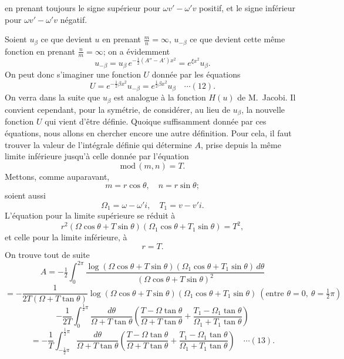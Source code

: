 \documentclass[12pt,a4paper]{article}
\begin{document}
\newpage
\setcounter{page}{162}

en prenant toujours le signe sup\'erieur pour $\omega v' - \omega' v$ positif, et le signe inf\'erieur pour $\omega v' - \omega' v$ n\'egatif.

Soient $u_\beta$ ce que devient $u$ en prenant $\tfrac{m}{n} = \infty$, $u_{-\beta}$ ce que devient cette m\^eme fonction en prenant $\tfrac{n}{m} = \infty$; on a \'evidemment
\[
u_{-\beta} = u_\beta\,e^{-\frac{1}{2}(A''-A')x^2} = e^{\xi x^2}u_\beta.
\]
On peut donc s'imaginer une fonction $U$ donn\'ee par les \'equations
\[
U = e^{-\frac12\beta x^2} u_{-\beta} = e^{\frac12\beta x^2} u_\beta \quad\cdots(12).
\]
On verra dans la suite que $u_\beta$ est analogue \`a la fonction $H(u)$ de M.~Jacobi. Il convient cependant, pour la sym\'etrie, de consid\'erer, au lieu de $u_\beta$, la nouvelle fonction $U$ qui vient d'\^etre d\'efinie. Quoique suffisamment donn\'ee par ces \'equations, nous allons en chercher encore une autre d\'efinition. Pour cela, il faut trouver la valeur de l'int\'egrale d\'efinie qui d\'etermine $A$, prise depuis la m\^eme limite inf\'erieure jusqu'\`a celle donn\'ee par l'\'equation
\[
\mathrm{mod}\,(m,n) = T.
\]
Mettons, comme auparavant,
\[
m = r\cos\theta,\quad n = r\sin\theta;
\]
soient aussi
\[
\Omega_1 = \omega - \omega' i,\quad T_1 = v - v' i.
\]
L'\'equation pour la limite sup\'erieure se r\'eduit \`a
\[
r^2(\Omega\cos\theta + T\sin\theta)(\Omega_1\cos\theta + T_1\sin\theta) = T^2,
\]
et celle pour la limite inf\'erieure, \`a
\[
r = T.
\]
On trouve tout de suite
\[
A = -\tfrac{1}{2}\int_0^{2\pi}\frac{\log(\Omega\cos\theta + T\sin\theta)(\Omega_1\cos\theta + T_1\sin\theta)\,d\theta}{(\Omega\cos\theta + T\sin\theta)^2}
\]
\[
= -\frac{1}{2T(\Omega + T\tan\theta)}\log(\Omega\cos\theta + T\sin\theta)(\Omega_1\cos\theta + T_1\sin\theta)\ (\text{entre } \theta = 0,\ \theta = \tfrac12\pi)
\]
\[
-\frac{1}{2T}\int_0^{\frac12\pi}\frac{d\theta}{\Omega + T\tan\theta}\!\left(\frac{T - \Omega\tan\theta}{\Omega + T\tan\theta} + \frac{T_1 - \Omega_1\tan\theta}{\Omega_1 + T_1\tan\theta}\right)
\]
\[
= -\frac{1}{T}\int_{-\frac12\pi}^{\frac12\pi}\frac{d\theta}{\Omega + T\tan\theta}\!\left(\frac{T - \Omega\tan\theta}{\Omega + T\tan\theta} + \frac{T_1 - \Omega_1\tan\theta}{\Omega_1 + T_1\tan\theta}\right) \quad\cdots(13).
\]

\newpage
\setcounter{page}{163}
\end{document}
